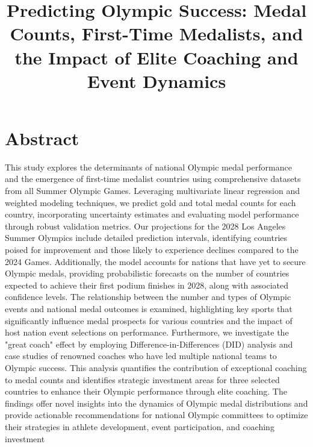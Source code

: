 \documentclass[12pt,a4paper]{article}
\begin{document}
\title{Predicting Olympic Success: Medal Counts, First-Time Medalists, and the Impact of Elite Coaching and Event Dynamics}
\author{}
\date{}
\maketitle



\section*{Abstract}
This study explores the determinants of national Olympic medal
    performance and the emergence of first-time medalist countries using
    comprehensive datasets from all Summer Olympic Games. Leveraging
    multivariate linear regression and weighted modeling techniques, we
    predict gold and total medal counts for each country, incorporating
    uncertainty estimates and evaluating model performance through robust
    validation metrics. Our projections for the 2028 Los Angeles Summer
    Olympics include detailed prediction intervals, identifying countries
    poised for improvement and those likely to experience declines compared
    to the 2024 Games. Additionally, the model accounts for nations that
    have yet to secure Olympic medals, providing probabilistic forecasts on
    the number of countries expected to achieve their first podium finishes
    in 2028, along with associated confidence levels. The relationship
    between the number and types of Olympic events and national medal
    outcomes is examined, highlighting key sports that significantly
    influence medal prospects for various countries and the impact of host
    nation event selections on performance. Furthermore, we investigate the
    "great coach" effect by employing Difference-in-Differences (DID)
    analysis and case studies of renowned coaches who have led multiple
    national teams to Olympic success. This analysis quantifies the
    contribution of exceptional coaching to medal counts and identifies
    strategic investment areas for three selected countries to enhance their
    Olympic performance through elite coaching. The findings offer novel
    insights into the dynamics of Olympic medal distributions and provide
    actionable recommendations for national Olympic committees to optimize
    their strategies in athlete development, event participation, and
    coaching investment
\end{document}
